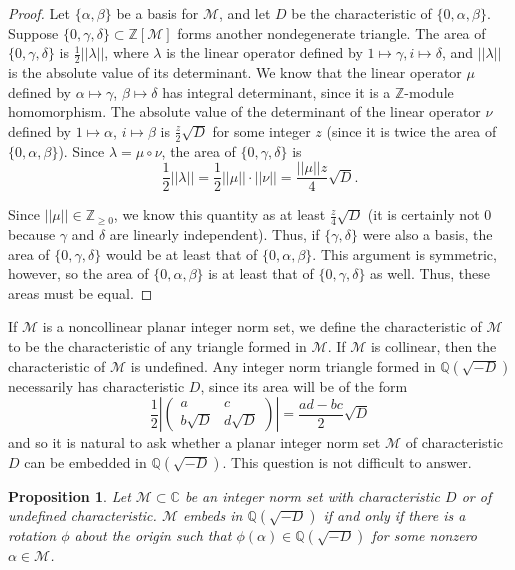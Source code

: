 \documentclass[10pt]{amsart}
\newcommand{\M}{\mathcal{M}}
\newcommand{\Q}{\mathbb{Q}}
\newcommand{\Z}{\mathbb{Z}}
\newcommand{\C}{\mathbb{C}}
\newtheorem{prop}[thm]{Proposition}
\begin{document}
\begin{proof}
Let $\{\alpha, \beta\}$ be a basis for $\M$, and let $D$ be the characteristic of $\{0,\alpha,\beta\}$.  Suppose $\{0,\gamma, \delta \} \subset \Z[\M]$ forms another nondegenerate triangle.  The area of $\{0,\gamma, \delta\}$ is $\frac{1}{2}||\lambda||$, where $\lambda$ is the linear operator defined by $1 \mapsto \gamma, i \mapsto \delta$, and $||\lambda||$ is the absolute value of its determinant.  We know that the linear operator $\mu$ defined by $\alpha \mapsto \gamma$, $\beta \mapsto \delta$ has integral determinant, since it is a $\Z$-module homomorphism.  The absolute value of the determinant of the linear operator $\nu$ defined by $1 \mapsto \alpha$, $i \mapsto \beta$ is $\frac{z}{2}\sqrt{D}$ for some integer $z$ (since it is twice the area of $\{0,\alpha, \beta\}$).  Since $\lambda = \mu \circ \nu$, the area of $\{0,\gamma, \delta\}$ is
$$
\frac12 ||\lambda|| = \frac{1}{2}||\mu|| \cdot ||\nu|| = \frac{||\mu||z}{4}\sqrt{D}.
$$

Since $||\mu|| \in \Z_{\geq 0}$, we know this quantity as at least $\frac{z}{4}\sqrt{D}$ (it is certainly not 0 because $\gamma$ and $\delta$ are linearly independent).  Thus, if $\{\gamma, \delta\}$ were also a basis, the area of $\{0, \gamma, \delta\}$ would be at least that of $\{0,\alpha,\beta\}$.  This argument is symmetric, however, so the area of $\{0,\alpha,\beta\}$ is at least that of $\{0, \gamma, \delta\}$ as well.  Thus, these areas must be equal.
\end{proof}

If $\M$ is a noncollinear planar integer norm set, we define the characteristic of $\M$ to be the characteristic of any triangle formed in $\M$.  If $\M$ is collinear, then the characteristic of $\M$ is undefined.  Any integer norm triangle formed in $\Q(\sqrt{-D})$ necessarily has characteristic $D$, since its area will be of the form
$$
\frac{1}{2} \left| \begin{pmatrix}
a & c \\
b\sqrt{D} & d\sqrt{D}
\end{pmatrix}\right|
= \frac{ad - bc}{2} \sqrt{D}
$$
and so it is natural to ask whether a planar integer norm set $\M$ of characteristic $D$ can be embedded in $\Q(\sqrt{-D})$.  This question is not difficult to answer.

\begin{prop} \label{prop:ratemb}
\normalfont
Let $\M \subset \C$ be an integer norm set with characteristic $D$ or of undefined characteristic.  $\M$ embeds in $\Q(\sqrt{-D})$ if and only if there is a rotation $\phi$ about the origin such that $\phi(\alpha) \in \Q(\sqrt{-D})$ for some nonzero $\alpha \in \M$.
\end{prop}
\end{document}
